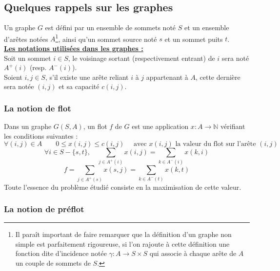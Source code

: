 \subsection{Quelques rappels sur les graphes}

Un graphe $G$ est défini par un ensemble de sommets noté $S$ et un ensemble d'arêtes notées
$A$\footnote{Il paraît important de faire remarquer que la définition d'un graphe non simple est
	parfaitement rigoureuse, si l'on rajoute à cette définition une fonction dite d'incidence notée
	$\gamma : A \rightarrow S \times S$ qui associe à chaque arête de $A$ un couple de sommets de
$S$.}, ainsi qu'un sommet source noté $s$ et un sommet puits $t$.\\

\textbf{\underline{Les notations utilisées dans les graphes :}}\\

Soit un sommet $i \in S$, le voisinage sortant (respectivement entrant) de $i$ sera noté $A^+(i)$
(resp. $A^-(i)$).\\
Soient $i, j \in S$, s'il existe une arête reliant $i$ à $j$ appartenant à $A$, cette dernière sera
notée $(i,j)$ et sa capacité $c(i,j)$.

\subsubsection{La notion de flot}

Dans un graphe $G (S, A)$, un flot $f$ de $G$ est une application $x : A \rightarrow \mathbb{N}$
vérifiant les conditions suivantes : 
		\begin{equation}
			\label{flot_1}
			\forall (i,j) \in A \qquad 0 \leq x(i,j) \leq c(i,j)\quad \mbox{ avec }x(i,j)\mbox{ la valeur du flot sur
			l'arête }(i,j)
		\end{equation} 
		\begin{equation} 
			\label{flot_2}
			\forall i \in S - \{s,t\},\quad \sum_{j \in A^+(i)} x(i,j) = \sum_{k \in A^-(i)} x(k,i)
		\end{equation}
		\begin{equation}
			\label{flot_3}
			f = \sum_{j \in A^+(s)} x(s,j) = \sum_{k \in A^-(t)} x(k, t)
		\end{equation}
Toute l'essence du problème étudié consiste en la maximisation de cette valeur.

\subsubsection{La notion de préflot}

